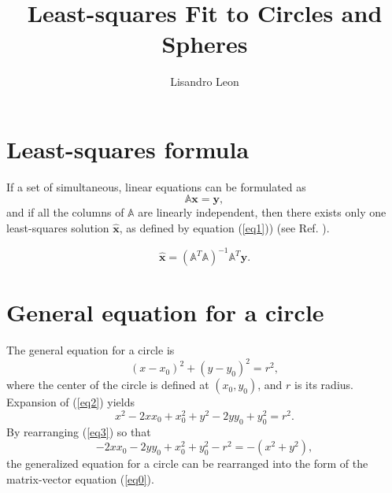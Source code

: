 \documentclass[11pt,letterpaper,onecolumn]{IEEEtran}
\begin{document}
\title{Least-squares Fit to Circles and Spheres}
\author{Lisandro Leon}
\maketitle


\begin{comment}
\section{Problem Statement}
\begin{figure}[!h]
	\center{
		\includegraphics[width=0.2\textwidth]
		{three-link planar serial manipulator.png}
	}
	\caption{loop-shape superimposed as a visual tool for controller design}\label{fig2}
\end{figure}
\end{comment}

\section{Least-squares formula}
If a set of simultaneous, linear equations can be formulated as
\begin{equation}
\mathbb{A} \mathbf{x} = \mathbf{y},\label{eq0}
\end{equation}
and if all the columns of $\mathbb{A}$ are linearly independent, then there exists only one least-squares solution $\hat{\mathbf{x}}$, as defined by equation (\ref{eq1})) (see Ref. \cite{ref1}).
\begin{comment}
\begin{equation}
\mathbb{X}^T \mathbb{X} \mathbb{B} = \mathbb{X}^T \mathbf{y}.\label{eq1}
\end{equation}
\end{comment}
\begin{equation}
\hat{\mathbf{x}} = \left(\mathbb{A}^T \mathbb{A}\right)^{-1} \mathbb{A}^T \mathbf{y}.\label{eq1}
\end{equation}


\section{General equation for a circle}
The general equation for a circle is
\begin{equation}
\left(x-x_0\right)^2 + \left(y-y_0\right)^2 = r^2,\label{eq2}
\end{equation}
where the center of the circle is defined at $\left(x_0, y_0\right)$, and $r$ is its radius.
Expansion of (\ref{eq2}) yields
\begin{equation}
x^2 -2x x_0 +x_0^2 + y^2 -2y y_0 +y_0^2 = r^2\label{eq3}.
\end{equation}
By rearranging (\ref{eq3}) so that
\begin{equation}
-2x x_0 -2y y_0 +x_0^2 +y_0^2 -r^2 = -\left(x^2 + y^2\right),\label{eq4}
\end{equation}
the generalized equation for a circle can be rearranged into the form of the matrix-vector equation (\ref{eq0}).
\end{document}
